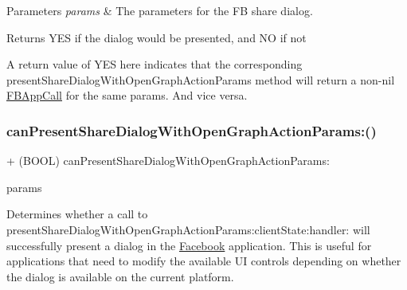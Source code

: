 \begin{DoxyParams}{Parameters}
{\em params} & The parameters for the FB share dialog.\\
\hline
\end{DoxyParams}
\begin{DoxyReturn}{Returns}
Y\+ES if the dialog would be presented, and NO if not
\end{DoxyReturn}
A return value of Y\+ES here indicates that the corresponding present\+Share\+Dialog\+With\+Open\+Graph\+Action\+Params method will return a non-\/nil \hyperlink{interfaceFBAppCall}{F\+B\+App\+Call} for the same params. And vice versa. \mbox{\label{interfaceFBDialogs_ad8921a3906d28210cad0c0871e99f4bd}} 
\subsubsection{\texorpdfstring{can\+Present\+Share\+Dialog\+With\+Open\+Graph\+Action\+Params\+:()}{canPresentShareDialogWithOpenGraphActionParams:()}\hspace{0.1cm}{\footnotesize\ttfamily [4/5]}}
{\footnotesize\ttfamily + (B\+O\+OL) can\+Present\+Share\+Dialog\+With\+Open\+Graph\+Action\+Params\+: \begin{DoxyParamCaption}\item[{(\hyperlink{interfaceFBOpenGraphActionParams}{F\+B\+Open\+Graph\+Action\+Params} $\ast$)}]{params }\end{DoxyParamCaption}}

Determines whether a call to present\+Share\+Dialog\+With\+Open\+Graph\+Action\+Params\+:client\+State\+:handler\+: will successfully present a dialog in the \hyperlink{interfaceFacebook}{Facebook} application. This is useful for applications that need to modify the available UI controls depending on whether the dialog is available on the current platform.


